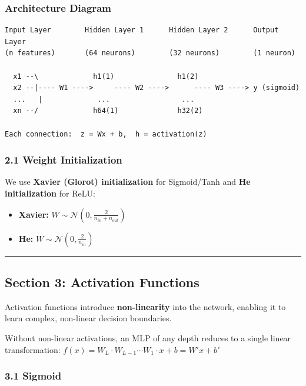 \documentclass[11pt]{article}
\providecommand{\tightlist}{%
      \setlength{\itemsep}{0pt}\setlength{\parskip}{0pt}}
\begin{document}
\subsubsection{Architecture Diagram}\label{architecture-diagram}

\begin{verbatim}
Input Layer        Hidden Layer 1      Hidden Layer 2      Output Layer
(n features)       (64 neurons)        (32 neurons)        (1 neuron)

  x1 --\             h1(1)               h1(2)
  x2 --|---- W1 ---->     ---- W2 ---->      ---- W3 ----> y (sigmoid)
  ...   |             ...                 ...
  xn --/             h64(1)              h32(2)

Each connection:  z = Wx + b,  h = activation(z)
\end{verbatim}


    \subsubsection{2.1 Weight Initialization}\label{weight-initialization}

We use \textbf{Xavier (Glorot) initialization} for Sigmoid/Tanh and
\textbf{He initialization} for ReLU:

\begin{itemize}
\tightlist
\item
  \textbf{Xavier:}
  \(W \sim \mathcal{N}\left(0, \frac{2}{n_{in} + n_{out}}\right)\)
\item
  \textbf{He:} \(W \sim \mathcal{N}\left(0, \frac{2}{n_{in}}\right)\)
\end{itemize}

    \begin{center}\rule{0.5\linewidth}{0.5pt}\end{center}

\subsection{Section 3: Activation
Functions}\label{section-3-activation-functions}

Activation functions introduce \textbf{non-linearity} into the network,
enabling it to learn complex, non-linear decision boundaries.

Without non-linear activations, an MLP of any depth reduces to a single
linear transformation:
\(f(x) = W_L \cdot W_{L-1} \cdots W_1 \cdot x + b = W'x + b'\)

\subsubsection{3.1 Sigmoid}\label{sigmoid}
\end{document}
